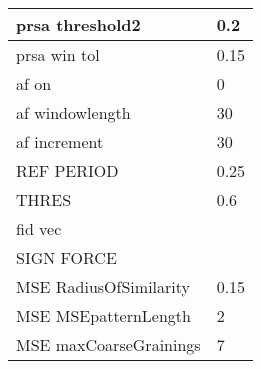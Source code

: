 \begin{tabular}{|l|l|}
prsa threshold2&0.2\\\hline
prsa win tol&0.15\\\hline
af on&0\\\hline
af windowlength&30\\\hline
af increment&30\\\hline
REF PERIOD&0.25\\\hline
THRES&0.6\\\hline
fid vec&\\\hline
SIGN FORCE&\\\hline
MSE RadiusOfSimilarity&0.15\\\hline
MSE MSEpatternLength&2\\\hline
MSE maxCoarseGrainings&7\\\hline
\end{tabular}
